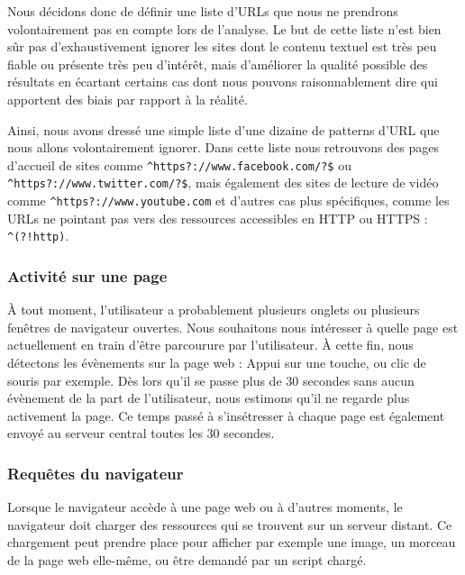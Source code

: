 			Nous décidons donc de définir une liste d'URLs que nous ne prendrons volontairement pas en compte lors de l'analyse. Le but de cette liste n'est bien sûr pas d'exhaustivement ignorer les sites dont le contenu textuel est très peu fiable ou présente très peu d'intérêt, mais d'améliorer la qualité possible des résultats en écartant certains cas dont nous pouvons raisonnablement dire qui apportent des biais par rapport à la réalité.

			Ainsi, nous avons dressé une simple liste d'une dizaine de patterns d'URL que nous allons volontairement ignorer. Dans cette liste nous retrouvons des pages d'accueil de sites comme \texttt{\^{}https?://www.facebook.com/?\$} ou \linebreak
			\texttt{\^{}https?://www.twitter.com/?\$}, mais également des sites de lecture de vidéo comme \texttt{\^{}https?://www.youtube.com} et d'autres cas plus spécifiques, comme les URLs ne pointant pas vers des ressources accessibles en HTTP ou HTTPS : \texttt{\^{}(?!http)}.

		\subsubsection{Activité sur une page}

			À tout moment, l'utilisateur a probablement plusieurs onglets ou plusieurs fenêtres de navigateur ouvertes. Nous souhaitons nous intéresser à quelle page est actuellement en train d'être parcourure par l'utilisateur. À cette fin, nous détectons les évènements sur la page web : Appui sur une touche, ou clic de souris par exemple. Dès lors qu'il se passe plus de 30 secondes sans aucun évènement de la part de l'utilisateur, nous estimons qu'il ne regarde plus activement la page. Ce temps passé à s'insétresser à chaque page est également envoyé au serveur central toutes les 30 secondes.

		\subsubsection{Requêtes du navigateur}

			Lorsque le navigateur accède à une page web ou à d'autres moments, le navigateur doit charger des ressources qui se trouvent sur un serveur distant. Ce chargement peut prendre place pour afficher par exemple une image, un morceau de la page web elle-même, ou être demandé par un script chargé.

